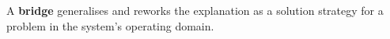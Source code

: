 


\begin{defn}\label{def:bridge}
\hypertarget{def:bridge}{}A \textbf{bridge} generalises and reworks
the explanation as a solution strategy for a problem in the system's
operating domain.
\end{defn}
                                         

